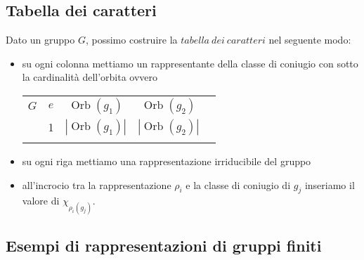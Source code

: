 \documentclass[11pt]{article}
\theoremstyle{plain}
\theoremstyle{definition}
\theoremstyle{remark}
\DeclareMathOperator{\Orb}{Orb}
\begin{document}
\subsection{Tabella dei caratteri}


Dato un gruppo $G$, possimo costruire la $tabella\ dei\ caratteri$ nel seguente modo:
\begin{itemize}
\item su ogni colonna mettiamo un rappresentante della classe di coniugio con sotto la cardinalità dell'orbita ovvero

\begin{table}[!ht]
\centering
\begin{tabular}{|c|c|c|c|c}
\hline
$G$  & $e$ & $\Orb(g_1)$ & $\Orb(g_2)$ & \\
 & 1 & $|\Orb(g_1)|$ & $|\Orb(g_2)|$ & \\
\hline
 & &  & \\
\end{tabular}
\end{table}

\item su ogni riga mettiamo una rappresentazione irriducibile del gruppo
\item all'incrocio tra la rappresentazione $\rho_i$ e la classe di coniugio di $g_j$ inseriamo il valore di $\chi_{\rho_i(g_j)}$.


\end{itemize}



\subsection{Esempi di rappresentazioni di gruppi finiti}
\end{document}
